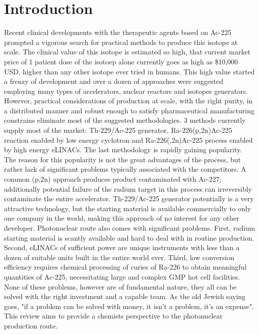 \section{Introduction}
\label{sec:introduction}

Recent clinical developments \cite{bib1} with the therapeutic agents based on Ac-225 prompted a vigorous search for practical methods to produce this isotope at scale. The clinical value of this isotope is estimated so high, that current market price of 1 patient dose of the isotoep alone currently goes as high as \$10,000 USD, higher than any other isotope ever tried in humans. This high value started a frenzy of development and over a dozen of approaches were suggested employing many types of accelerators, nuclear reactors and isotopes generators. However, practical considerations of production at scale, with the right purity, in a distributed manner and robust enough to satisfy pharmaceutical manufacturing constrains eliminate most of the suggested methodologies. 3 methods currently supply most of the market: Th-229/Ac-225 generator, Ra-226(p,2n)Ac-225 reaction enabled by low energy cyclotron and Ra-226(\gamma,2n)Ac-225 process enabled by high energy eLINACs.
The last methodology is rapidly gaining popularity. The reason for this popularity is not the great advantages of the process, but rather lack of significant problems typically associated with the competitors. A common (p,2n) approach produces product contaminated with Ac-227; additionally potential failure of the radium target in this process can irreversibly contaminate the entire accelerator. Th-229/Ac-225 generator potentially is a very attractive technology, but the starting material is available commercially to only one company in the world, making this approach of no interest for any other developer. Photonuclear route also comes with significant problems. First, radium starting material is scantly available and hard to deal with in routine production. Second, eLINACs of sufficient power are unique instruments with less than a dozen of suitable units built in the entire world ever. Third, low conversion efficiency requires chemical processing of curies of Ra-226 to obtain meaningful quantities of Ac-225, necessitating large and complex GMP hot cell facilities. None of these problems, however are of fundamental nature, they all can be solved with the right investment and a capable team. As the old Jewish saying goes, "if a problem can be solved with money, it isn't a problem, it's an expense".
This review aims to provide a chemists perspective to the photonuclear production route. 


